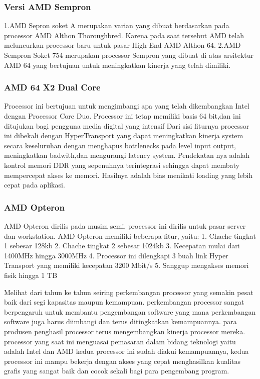 			\subsubsection {Versi AMD Sempron}
 	 1.AMD Sepron soket A merupakan varian yang dibuat berdasarkan pada processor AMD Althon Thoroughbred. Karena pada saat tersebut AMD telah meluncurkan processor baru untuk pasar High-End AMD Althon 64.
 	 2.AMD Sempron Soket 754 merupakan processor Sempron yang dibuat di atas arsitektur AMD 64 yang bertujuan untuk meningkatkan kinerja yang telah dimiliki.


			\subsubsection{AMD 64 X2 Dual Core}
 	Processor ini bertujuan untuk mengimbangi apa yang telah dikembangkan Intel dengan Processor Core Duo. Processor ini tetap memiliki basis 64 bit,dan ini ditujukan bagi pengguna media digital yang intensif
 	Dari sisi fiturnya processor ini dibekali dengan HyperTransport yang dapat meningkatkan kinerja system secara keseluruhan dengan menghapus bottlenecks pada level input output, meningkatkan badwith,dan mengurangi latency system. Pendekatan nya adalah kontrol memori DDR yang sepenuhnya terintegrasi sehingga dapat membaty mempercepat akses ke memori. Hasilnya adalah bias menikati loading yang lebih cepat pada aplikasi.


 			\subsubsection{AMD Opteron}
	AMD Opteron dirilis pada musim semi, processor ini dirilis untuk pasar server dan workstation. AMD Opteron memiliki beberapa fitur, yaitu:
		1. Chache tingkat 1 sebesar 128kb
		2. Chache tingkat 2 sebesar 1024kb
		3. Kecepatan mulai dari 1400MHz hingga 3000MHz
		4. Processor ini dilengkapi 3 buah link Hyper Transport yang memiliki kecepatan 3200 Mbit/s
		5. Sanggup mengakses memori fisik hingga 1 TB 


			

 	Melihat dari tahun ke tahun seiring perkembangan processor yang semakin pesat baik dari segi kapasitas maupun kemampuan. perkembangan processor sangat berpengaruh untuk membantu pengembangan software yang mana perkembangan software juga harus diimbangi dan terus ditingkatkan kemampuannya. para produsen penghasil processor terus mengembangkan kinerja processor mereka. processor yang saat ini menguasai pemasaran dalam bidang teknologi yaitu adalah Intel dan AMD kedua processor ini sudah diakui kemampuannya, kedua processor ini mampu bekerja dengan akses yang cepat menghasilkan kualitas grafis yang sangat baik dan cocok sekali bagi para pengembang program.\cite{irwansyah2014pengantar} 




